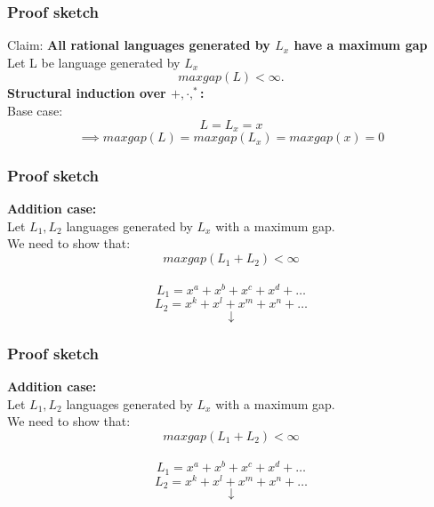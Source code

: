 \documentclass{beamer}
\begin{document}
\begin{frame}
  \frametitle{Proof sketch}
  Claim: {\bf
    All rational languages generated by $L_x$ have a
    maximum gap
  }\\
  Let L be language generated by $L_x$
  \[ maxgap(L) < \infty. \]
  {\bf Structural induction over $+, \cdot, ^*$:}\\
  \vspace{1cm}
  Base case: \\
  \[L = L_x = x\]
  \[ \implies maxgap(L) = maxgap(L_x) = maxgap(x) = 0\]
\end{frame}
\begin{frame}
  \frametitle{Proof sketch}
  {\bf Addition case:}\\
  Let $L_1,L_2$ languages generated by $L_x$ with a maximum gap.\\
  We need to show that: 
  \[ maxgap(L_1+L_2) < \infty \]\\
  \[ L_1 = x^a + x^b + x^c + x^d + \dots  \]
  \[ L_2 = x^k + x^l + x^m + x^n + \dots  \]
  \vspace{0.05cm}
  \[ \downarrow \]
  \vspace{0.05cm}
  \begin{center}
  \end{center}
\end{frame}
\begin{frame}
  \frametitle{Proof sketch}
  {\bf Addition case:}\\
  Let $L_1,L_2$ languages generated by $L_x$ with a maximum gap.\\
  We need to show that: 
  \[ maxgap(L_1+L_2) < \infty \]\\
  \[ L_1 = x^a + x^b + x^c + x^d + \dots  \]
  \[ L_2 = x^k + x^l + x^m + x^n + \dots  \]
  \vspace{0.05cm}
  \[ \downarrow \]
  \vspace{0.05cm}
  \begin{center}
  \end{center}
\end{frame}
\end{document}
